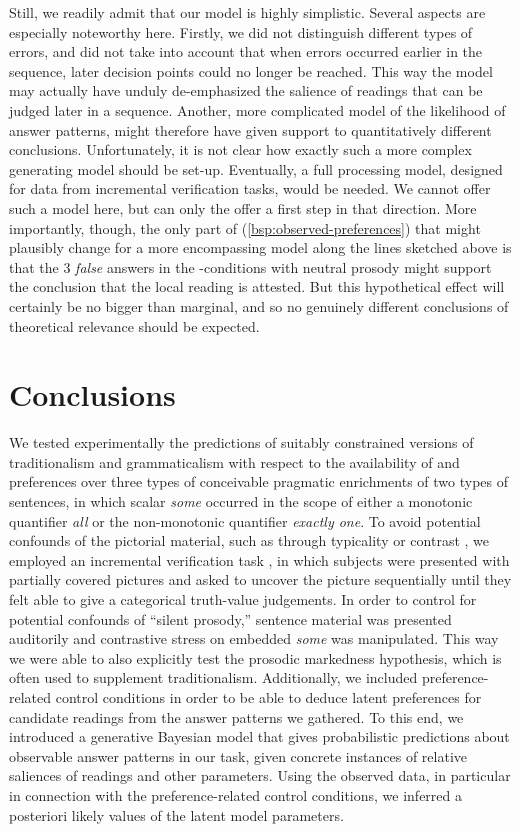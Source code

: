 \documentclass[fleqn,reqno,10pt]{article}
\newcommand{\as}{\acro{as}}
\begin{document}
Still, we readily admit that our model is highly simplistic. Several
aspects are especially noteworthy here. Firstly, we did not
distinguish different types of errors, and did not take into account
that when errors occurred earlier in the sequence, later decision
points could no longer be reached. This way the model may actually
have unduly de-emphasized the salience of readings that can be judged
later in a sequence. Another, more complicated model of the likelihood
of answer patterns, might therefore have given support to
quantitatively different conclusions. Unfortunately, it is not clear
how exactly such a more complex generating model should be
set-up. Eventually, a full processing model, designed for data from
incremental verification tasks, would be needed. We cannot offer such
a model here, but can only the offer a first step in that
direction. More importantly, though, the only part of
(\ref{bsp:observed-preferences}) that might plausibly change for a
more encompassing model along the lines sketched above is that the 3
\emph{false} answers in the \as-conditions with neutral prosody
might support the conclusion that the local reading is attested. But
this hypothetical effect will certainly be no bigger than marginal,
and so no genuinely different conclusions of theoretical relevance
should be expected.

\section{Conclusions}
\label{sec:conclusions}

We tested experimentally the predictions of suitably constrained
versions of traditionalism and grammaticalism with respect to the
availability of and preferences over three types of conceivable
pragmatic enrichments of two types of sentences, in which scalar
\emph{some} occurred in the scope of either a monotonic quantifier
\emph{all} or the non-monotonic quantifier \emph{exactly one}. To
avoid potential confounds of the pictorial material, such as through
typicality or contrast
\citep{Tielvan-Tiel2012:Embedded-Scalar,GeurtsTielvan-Tiel2013:Embedded-Scalar},
we employed an incremental verification task \citep{Conroy2008}, in
which subjects were presented with partially covered pictures and
asked to uncover the picture sequentially until they felt able to give
a categorical truth-value judgements. In order to control for
potential confounds of ``silent prosody,'' sentence material was
presented auditorily and contrastive stress on embedded \emph{some}
was manipulated. This way we were able to also explicitly test the
prosodic markedness hypothesis, which is often used to supplement
traditionalism. Additionally, we included preference-related control
conditions in order to be able to deduce latent preferences for
candidate readings from the answer patterns we gathered. To this end,
we introduced a generative Bayesian model that gives probabilistic
predictions about observable answer patterns in our task, given
concrete instances of relative saliences of readings and other
parameters. Using the observed data, in particular in connection with
the preference-related control conditions, we inferred a posteriori
likely values of the latent model parameters.
\end{document}
